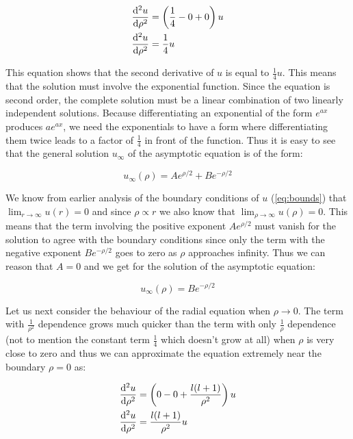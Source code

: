 \documentclass{article}
\begin{document}
    \begin{align}
        \odv[order = 2]{u}{\rho} &= \left( \frac{1}{4} - 0 + 0 \right)u \\ 
        \odv[order = 2]{u}{\rho} &= \frac{1}{4}u 
    \end{align}

    This equation shows that the second derivative of $u$ is equal to $\frac{1}{4}u$. This means that the solution must involve the exponential function. Since the equation is second order, the
    complete solution must be a linear combination of two linearly independent solutions. Because differentiating an exponential of the form $e^{ax}$ produces $ae^{ax}$, we need the exponentials
    to have a form where differentiating them twice leads to a factor of $\frac{1}{4}$ in front of the function. Thus it is easy to see that the general solution
    $u_{\infty}$ of the asymptotic equation is of the form:

    \begin{equation}
        u_{\infty}(\rho) = Ae^{\rho/2} + Be^{-\rho/2}
    \end{equation}

    We know from earlier analysis of the boundary conditions of $u$ (\ref{eq:bounds}) that $\lim_{r \to \infty}u(r) = 0$ and since $\rho \propto r$ we also know that $\lim_{\rho \to \infty}u(\rho) = 0$.
    This means that the term involving the positive exponent $Ae^{\rho/2}$ must vanish for the solution to agree with the boundary conditions since only the term with the negative exponent $Be^{-\rho/2}$
    goes to zero as $\rho$ approaches infinity. Thus we can reason that $A = 0$ and we get for the solution of the asymptotic equation:

    \begin{equation}
        u_{\infty}(\rho) = Be^{-\rho/2}
    \end{equation}

    Let us next consider the behaviour of the radial equation when $\rho \to 0$. The term with $\frac{1}{\rho^2}$ dependence grows much quicker than the term with only $\frac{1}{\rho}$ dependence
    (not to mention the constant term $\frac{1}{4}$ which doesn't grow at all) when $\rho$ is very close to zero and thus we can approximate the equation extremely near the boundary $\rho = 0$ as:

    \begin{align}
        \odv[order = 2]{u}{\rho} &= \left( 0 - 0 + \frac{l(l + 1)}{\rho^2} \right)u \\
        \odv[order = 2]{u}{\rho} &= \frac{l(l + 1)}{\rho^2}u
    \end{align}
\end{document}
